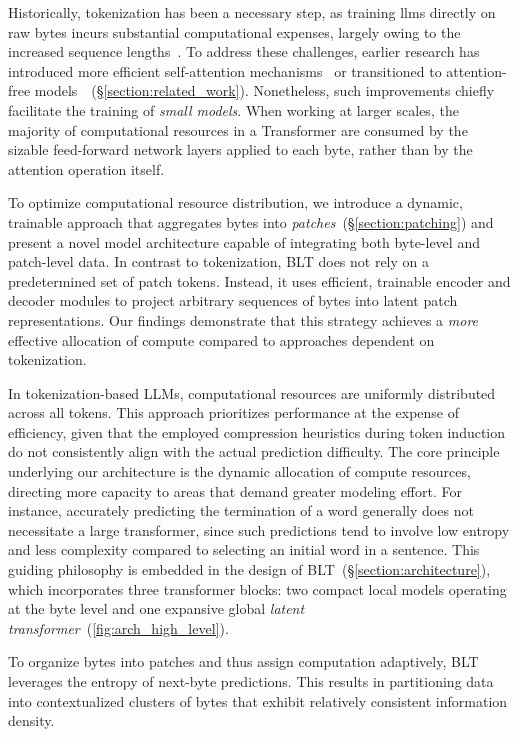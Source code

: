 Historically, tokenization has been a necessary step, as training llms directly on raw bytes incurs substantial computational expenses, largely owing to the increased sequence lengths~\citep{xue2022byt5}. To address these challenges, earlier research has introduced more efficient self-attention mechanisms~\citep{el2020characterbert, clark2022canine} or transitioned to attention-free models~\citep{wang2024mambabyte}~(\S\ref{section:related_work}). Nonetheless, such improvements chiefly facilitate the training of \textit{small models}. When working at larger scales, the majority of computational resources in a Transformer are consumed by the sizable feed-forward network layers applied to each byte, rather than by the attention operation itself.

To optimize computational resource distribution, we introduce a dynamic, trainable approach that aggregates bytes into \textit{patches}~(\S\ref{section:patching}) and present a novel model architecture capable of integrating both byte-level and patch-level data. In contrast to tokenization, {\textsc BLT} does not rely on a predetermined set of patch tokens. Instead, it uses efficient, trainable encoder and decoder modules to project arbitrary sequences of bytes into latent patch representations. Our findings demonstrate that this strategy achieves a \textit{more} effective allocation of compute compared to approaches dependent on tokenization.

In tokenization-based LLMs, computational resources are uniformly distributed across all tokens. This approach prioritizes performance at the expense of efficiency, given that the employed compression heuristics during token induction do not consistently align with the actual prediction difficulty. The core principle underlying our architecture is the dynamic allocation of compute resources, directing more capacity to areas that demand greater modeling effort. For instance, accurately predicting the termination of a word generally does not necessitate a large transformer, since such predictions tend to involve low entropy and less complexity compared to selecting an initial word in a sentence. This guiding philosophy is embedded in the design of {\textsc BLT}~(\S\ref{section:architecture}), which incorporates three transformer blocks: two compact local models operating at the byte level and one expansive global \textit{latent transformer}~(\autoref{fig:arch_high_level}). 

To organize bytes into patches and thus assign computation adaptively, {\textsc BLT} leverages the entropy of next-byte predictions. This results in partitioning data into contextualized clusters of bytes that exhibit relatively consistent information density.

